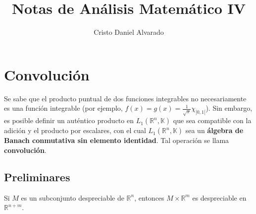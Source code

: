\documentclass[12pt]{report}
\theoremstyle{largebreak}
\begin{document}
    \setlength{\parskip}{5pt} %
    \setlength{\parindent}{12pt} %
    \title{Notas de Análisis Matemático IV}
    \author{Cristo Daniel Alvarado}
    \maketitle

    \tableofcontents %

    \setcounter{chapter}{1} %
 
    \chapter{Convolución}
    
    Se sabe que el producto puntual de dos funciones integrables no necesariamente es una función integrable (por ejemplo, $f(x)=g(x)=\frac{1}{\sqrt{x}}\chi_{]0,1[}$). Sin embargo, es posible definir un auténtico producto en $L_1(\mathbb{R}^n,\mathbb{K})$ que sea compatible con la adición y el producto por escalares, con el cual $L_1(\mathbb{R}^n,\mathbb{K})$ sea un \textbf{álgebra de Banach conmutativa sin elemento identidad}. Tal operación se llama \textbf{convolución}.

    \section{Preliminares}

    \begin{lema}
        Si $M$ es un subconjunto despreciable de $\mathbb{R}^n$, entonces $M\times\mathbb{R}^m$ es despreciable en $\mathbb{R}^{n+m}$.
    \end{lema}
\end{document}
